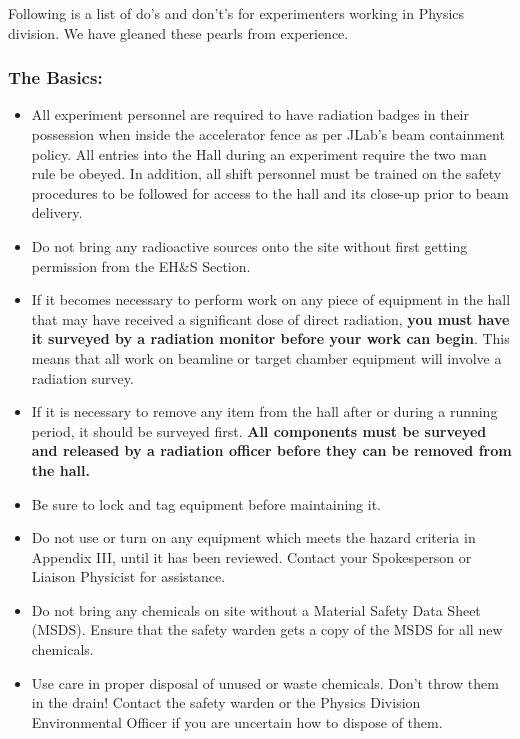 %
%

Following is a list of do's and don't's for experimenters working in Physics division. We 
have gleaned these pearls from experience.

\subsubsection*{The Basics:}
	
\begin{itemize}
\item All experiment personnel are required to have radiation badges in their possession when 
inside the accelerator fence as per JLab's beam containment policy. All entries into the 
Hall during an experiment require the two man rule be obeyed. In addition, all shift 
personnel must be trained on the safety procedures to be followed for access to the hall 
and its close-up prior to beam delivery.

\item Do not bring any radioactive sources onto the site without first getting permission from 
the EH\&S Section.

\item If it becomes necessary to perform work on any piece of equipment in the hall that may 
have received a significant dose of direct radiation, {\bf you must have it surveyed by a 
radiation monitor before your work can begin}.  This means that all work on beamline or 
target chamber equipment will involve a radiation survey.  

\item If it is necessary to remove any item from the hall after or during a running period, it 
should be surveyed first.  {\bf All components must be surveyed and released by a 
radiation officer before they can be removed from the hall.} 

\item Be sure to lock and tag equipment before maintaining it.

\item Do not use or turn on any equipment which meets the hazard criteria in Appendix III, until it has been reviewed. Contact your Spokesperson or Liaison Physicist for
 assistance.

\item Do not bring any chemicals on site without a Material Safety Data Sheet (MSDS).  
Ensure that the safety warden gets a copy of the MSDS for all new chemicals.

\item Use care in proper disposal of unused or waste chemicals. Don't throw them in the 
drain!  
Contact the safety warden or the Physics Division Environmental Officer if you are 
uncertain how to dispose of them.


\end{itemize}
